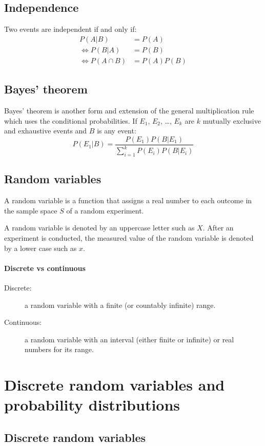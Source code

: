 \documentclass[10pt, twocolumn]{article}
\begin{document}
\subsection{Independence}
Two events are independent if and only if:
\begin{align*}
  P(A|B)           & = P(A)      \\
  \iff P(B|A)      & = P(B)      \\
  \iff P(A \cap B) & = P(A) P(B)
\end{align*}


\subsection{Bayes' theorem}
Bayes' theorem is another form and extension of the general multiplication rule which uses the conditional probabilities.
If \(E_1\), \(E_2\), \dots, \(E_k\) are \(k\) mutually exclusive and exhaustive events and \(B\) is any event:
\[
  P(E_1|B) = \frac{P(E_1)P(B|E_1)}{\sum_{i = 1}^k{P(E_i)P(B|E_i)}}
\]


\subsection{Random variables}
A random variable is a function that assigns a real number to each outcome in the sample space \(S\) of a random experiment.

A random variable is denoted by an uppercase letter such as \(X\).
After an experiment is conducted, the measured value of the random variable is denoted by a lower case such as \(x\).


\paragraph{Discrete vs continuous}
\begin{description}
  \item[Discrete:] a random variable with a finite (or countably infinite) range.
  \item[Continuous:] a random variable with an interval (either finite or infinite) or real numbers for its range.
\end{description}


\section{Discrete random variables and probability distributions}
\subsection{Discrete random variables}
\end{document}
